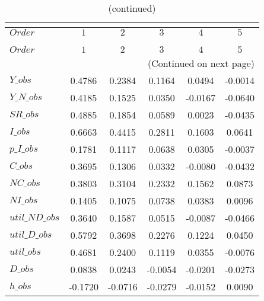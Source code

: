  
\begin{center}
\begin{longtable}{lccccc} 
\caption{COEFFICIENTS OF AUTOCORRELATION}\\
 \label{Table:th_autocorr_matrix}\\
\toprule 
$Order          $	 & 	 $          1$	 & 	 $          2$	 & 	 $          3$	 & 	 $          4$	 & 	 $          5$\\
\midrule \endfirsthead 
\caption{(continued)}\\
 \toprule \\ 
$Order          $	 & 	 $          1$	 & 	 $          2$	 & 	 $          3$	 & 	 $          4$	 & 	 $          5$\\
\midrule \endhead 
\midrule \multicolumn{6}{r}{(Continued on next page)} \\ \bottomrule \endfoot 
\bottomrule \endlastfoot 
$Y\_obs         $	 & 	     0.4786	 & 	     0.2384	 & 	     0.1164	 & 	     0.0494	 & 	    -0.0014 \\ 
$Y\_N\_obs      $	 & 	     0.4185	 & 	     0.1525	 & 	     0.0350	 & 	    -0.0167	 & 	    -0.0640 \\ 
$SR\_obs        $	 & 	     0.4885	 & 	     0.1854	 & 	     0.0589	 & 	     0.0023	 & 	    -0.0435 \\ 
$I\_obs         $	 & 	     0.6663	 & 	     0.4415	 & 	     0.2811	 & 	     0.1603	 & 	     0.0641 \\ 
$p\_I\_obs      $	 & 	     0.1781	 & 	     0.1117	 & 	     0.0638	 & 	     0.0305	 & 	    -0.0037 \\ 
$C\_obs         $	 & 	     0.3695	 & 	     0.1306	 & 	     0.0332	 & 	    -0.0080	 & 	    -0.0432 \\ 
$NC\_obs        $	 & 	     0.3803	 & 	     0.3104	 & 	     0.2332	 & 	     0.1562	 & 	     0.0873 \\ 
$NI\_obs        $	 & 	     0.1405	 & 	     0.1075	 & 	     0.0738	 & 	     0.0383	 & 	     0.0096 \\ 
$util\_ND\_obs  $	 & 	     0.3640	 & 	     0.1587	 & 	     0.0515	 & 	    -0.0087	 & 	    -0.0466 \\ 
$util\_D\_obs   $	 & 	     0.5792	 & 	     0.3698	 & 	     0.2276	 & 	     0.1224	 & 	     0.0450 \\ 
$util\_obs      $	 & 	     0.4681	 & 	     0.2400	 & 	     0.1119	 & 	     0.0355	 & 	    -0.0076 \\ 
$D\_obs         $	 & 	     0.0838	 & 	     0.0243	 & 	    -0.0054	 & 	    -0.0201	 & 	    -0.0273 \\ 
$h\_obs         $	 & 	    -0.1720	 & 	    -0.0716	 & 	    -0.0279	 & 	    -0.0152	 & 	     0.0090 \\ 
\end{longtable}
 \end{center}
